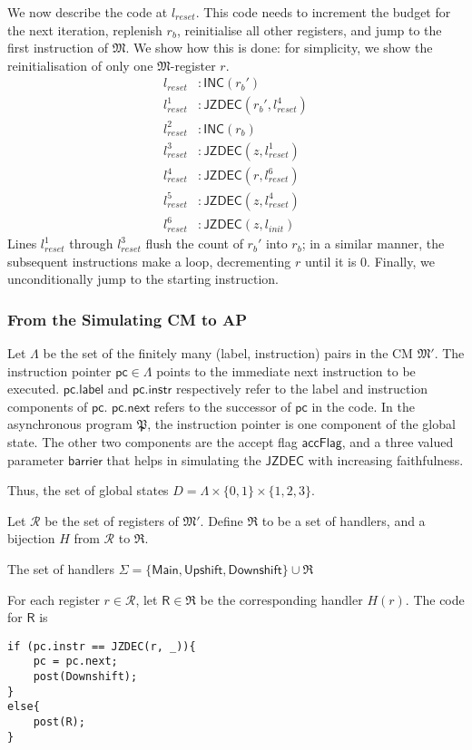 \documentclass{article}
\theoremstyle{remark}
\newcommand{\program}{\mathfrak{P}}
\newcommand{\machine}{\mathfrak{M}}
\newcommand{\inc}{\mathsf{INC}}
\newcommand{\jzdec}{\mathsf{JZDEC}}
\newcommand{\pc}{\mathsf{pc}}
\newcommand{\lab}{\mathsf{label}}
\newcommand{\instr}{\mathsf{instr}}
\newcommand{\nxt}{\mathsf{next}}
\newcommand{\main}{\mathsf{Main}}
\newcommand{\accflag}{\mathsf{accFlag}}
\newcommand{\barrier}{\mathsf{barrier}}
\newcommand{\upshift}{\mathsf{Upshift}}
\newcommand{\downshift}{\mathsf{Downshift}}
\begin{document}
We now describe the code at $l_{reset}$. This code needs to increment the budget for the next iteration, replenish $r_b$, reinitialise all other registers, and jump to the first instruction of $\machine$. We show how this is done: for simplicity, we show the reinitialisation of only one $\machine$-register $r$.
\begin{align*}
l_{reset} &: \inc(r_b') \\
l_{reset}^1 &: \jzdec(r_b', l_{reset}^4) \\
l_{reset}^2 &: \inc(r_b) \\
l_{reset}^3 &: \jzdec(z, l_{reset}^1) \\
l_{reset}^4 &: \jzdec(r, l_{reset}^6) \\
l_{reset}^5 &: \jzdec(z, l_{reset}^4) \\
l_{reset}^6 &: \jzdec(z, l_{init})
\end{align*}
Lines $l_{reset}^1$ through $l_{reset}^3$ flush the count of $r_b'$ into $r_b$; in a similar manner, the subsequent instructions make a loop, decrementing $r$ until it is $0$. Finally, we unconditionally jump to the starting instruction.

\subsubsection{From the Simulating CM to AP}
Let $\Lambda$ be the set of the finitely many (label, instruction) pairs in the CM $\machine'$. The instruction pointer $\pc \in \Lambda$ points to the immediate next instruction to be executed. $\pc.\lab$ and $\pc.\instr$ respectively refer to the label and instruction components of $\pc$. $\pc.\nxt$ refers to the successor of $\pc$ in the code. In the asynchronous program $\program$, the instruction pointer is one component of the global state. The other two components are the accept flag $\accflag$, and a three valued parameter $\barrier$ that helps in simulating the $\jzdec$ with increasing faithfulness. 

Thus, the set of global states $D = \Lambda \times \{0, 1\} \times \{1, 2, 3\}$. 

Let $\mathcal{R}$ be the set of registers of $\machine'$. Define $\mathfrak{R}$ to be a set of handlers, and a bijection $H$ from $\mathcal{R}$ to $\mathfrak{R}$. 

The set of handlers $\Sigma = \{\main, \upshift, \downshift\} \cup \mathfrak{R}$

For each register $r \in \mathcal{R}$, let $\mathsf{R} \in \mathfrak{R}$ be the corresponding handler $H(r)$. The code for $\mathsf{R}$ is
\begin{lstlisting}
if (pc.instr == JZDEC(r, _)){
	pc = pc.next;
	post(Downshift);
}
else{
	post(R);
}
\end{lstlisting}
\end{document}

